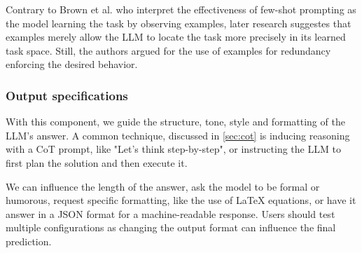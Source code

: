 \newpage
Contrary to Brown et al.\cite{brown2020languagemodelsfewshotlearners} who interpret the effectiveness of
few-shot prompting as the model learning the task by observing examples, later research\cite{reynolds2021promptprogramminglargelanguage}
suggestes that examples merely allow the LLM to locate the task more precisely in its learned task space.
Still, the authors argued for the use of examples for redundancy enforcing the desired behavior\cite{reynolds2021promptprogramminglargelanguage}.

\subsubsection{Output specifications}
With this component, we guide the structure, tone, style and formatting of the LLM's answer. 
A common technique, discussed in \ref{sec:cot} is inducing reasoning
with a CoT prompt, like "Let's think step-by-step", or instructing the LLM to 
first plan the solution and then execute it. 

We can influence the length of the answer, ask the model to be formal or humorous,
request specific formatting, like the use of \LaTeX{} equations, or have it answer in a JSON format
for a machine-readable response. Users should test multiple configurations as changing the output format
can influence the final prediction\cite{salinas2024butterflyeffectalteringprompts}.

